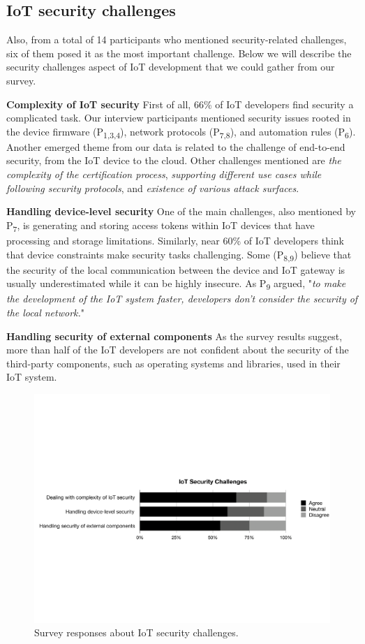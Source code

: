 {\subsection{IoT security challenges}
Also, from a total of 14 participants who mentioned security-related challenges, six of them posed it as the most important challenge. Below we will describe the security challenges aspect of IoT development that we could gather from our survey.

\textbf{Complexity of IoT security}
First of all, 66\% of IoT developers find security a complicated task. Our interview participants mentioned security issues rooted in the device firmware (P\textsubscript{1,3,4}), network protocols (P\textsubscript{7,8}), and automation rules (P\textsubscript{6}).  Another emerged theme from our data is related to the challenge of end-to-end security, from the IoT device to the cloud. Other challenges mentioned are \emph{the complexity of the certification process}, \emph{supporting different use cases while following security protocols}, and \emph{existence of various attack surfaces}.

\textbf{Handling device-level security}
One of the main challenges, also mentioned by P\textsubscript{7}, is generating and storing access tokens within IoT devices that have processing and storage limitations. Similarly, near 60\% of IoT developers think that device constraints make security tasks challenging.  Some (P\textsubscript{8,9}) believe that the security of the local communication between the device and IoT gateway is usually underestimated while it can be highly insecure. As P\textsubscript{9} argued, "\emph{to make the development of the IoT system faster, developers don't consider the security of the local network.}"

\textbf{Handling security of external components}
As the survey results suggest, more than half of the IoT developers are not confident about the security of the third-party components, such as operating systems and libraries, used in their IoT system. 

 \begin{figure}%
  \centering
   \includegraphics[width=\linewidth]{imgs/survey3}
  \caption{Survey responses about IoT security challenges.}
  \label{fig:survey3}
\end{figure}


}
